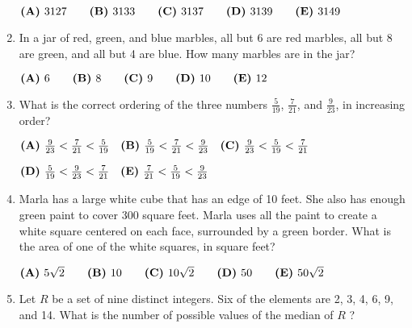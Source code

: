 \documentclass{article}
\begin{document}
\begin{enumerate}[label=\arabic*., itemsep=0.5em]
\( \textbf{(A)}\hspace{.05in}3127\qquad\textbf{(B)}\hspace{.05in}3133\qquad\textbf{(C)}\hspace{.05in}3137\qquad\textbf{(D)}\hspace{.05in}3139\qquad\textbf{(E)}\hspace{.05in}3149 \)\par \vspace{0.5em}\item In a jar of red, green, and blue marbles, all but 6 are red marbles, all but 8 are green, and all but 4 are blue. How many marbles are in the jar?

\( \textbf{(A)}\hspace{.05in}6\qquad\textbf{(B)}\hspace{.05in}8\qquad\textbf{(C)}\hspace{.05in}9\qquad\textbf{(D)}\hspace{.05in}10\qquad\textbf{(E)}\hspace{.05in}12 \)\par \vspace{0.5em}\item What is the correct ordering of the three numbers \( \frac{5}{19} \), \( \frac{7}{21} \), and \( \frac{9}{23} \), in increasing order?

\( \textbf{(A)}\hspace{.05in}\frac{9}{23}<\frac{7}{21}<\frac{5}{19}\quad\textbf{(B)}\hspace{.05in}\frac{5}{19}<\frac{7}{21}<\frac{9}{23}\quad\textbf{(C)}\hspace{.05in}\frac{9}{23}<\frac{5}{19}<\frac{7}{21} \) 

\( \textbf{(D)}\hspace{.05in}\frac{5}{19}<\frac{9}{23}<\frac{7}{21}\quad\textbf{(E)}\hspace{.05in}\frac{7}{21}<\frac{5}{19}<\frac{9}{23} \)\par \vspace{0.5em}\item Marla has a large white cube that has an edge of 10 feet. She also has enough green paint to cover 300 square feet. Marla uses all the paint to create a white square centered on each face, surrounded by a green border. What is the area of one of the white squares, in square feet?

\( \textbf{(A)}\hspace{.05in}5\sqrt2\qquad\textbf{(B)}\hspace{.05in}10\qquad\textbf{(C)}\hspace{.05in}10\sqrt2\qquad\textbf{(D)}\hspace{.05in}50\qquad\textbf{(E)}\hspace{.05in}50\sqrt2 \)\par \vspace{0.5em}\item Let \( R \)  be a set of nine distinct integers. Six of the elements are 2, 3, 4, 6, 9, and 14. What is the number of possible values of the median of \( R \) ?


\end{enumerate}
\end{document}
